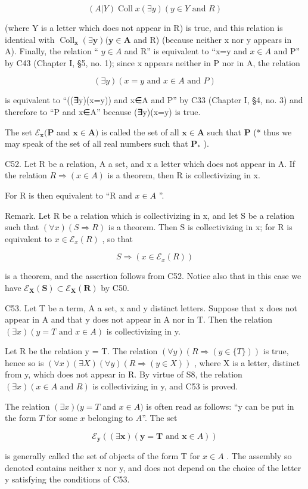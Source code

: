 \[
(A | Y) \operatorname{Coll} x (\exists y) (y \in Y \text {   and   } R)
\]

(where Y is a letter which does not appear in R) is true, and this relation is identical with \(\operatorname{Coll}_{\mathbf{x}}(\exists\mathbf{y})(\mathbf{y}\in\mathbf{A}\) and R) (because neither x nor y appears in A). Finally, the relation `` \(y\in A\) and R'' is equivalent to ``x=y and \(x\in A\) and P'' by C43 (Chapter I, §5, no. 1); since x appears neither in P nor in A, the relation

\[
(\exists y) (x = y \text {   and   } x \in A \text {   and   } P)
\]

is equivalent to ``((∃y)(x=y)) and x∈A and P'' by C33 (Chapter I, §4, no. 3) and therefore to ``P and x∈A'' because (∃y)(x=y) is true.

The set \(\mathcal{E}_{\pmb{x}}(\pmb{P}\) and \(\pmb{x} \in \pmb{A})\) is called the set of all \(\pmb{x} \in \pmb{A}\) such that \(\pmb{P}\) (* thus we may speak of the set of all real numbers such that \(\pmb{P}_{*}\) ).

C52. Let R be a relation, A a set, and x a letter which does not appear in A. If the relation \(R \Longrightarrow (x \in A)\) is a theorem, then R is collectivizing in x.

For R is then equivalent to ``R and \(x \in A\) ''.

Remark. Let R be a relation which is collectivizing in x, and let S be a relation such that \((\forall x)(S \Longrightarrow R)\) is a theorem. Then S is collectivizing in x; for R is equivalent to \(x \in \mathcal{E}_{x}(R)\) , so that

\[
S \Longrightarrow (x \in \mathcal {E} _ {x} (R))
\]

is a theorem, and the assertion follows from C52. Notice also that in this case we have \(\mathcal{E}_{\pmb{X}}(\pmb{S}) \subset \mathcal{E}_{\pmb{X}}(\pmb{R})\) by C50.

C53. Let T be a term, A a set, x and y distinct letters. Suppose that x does not appear in A and that y does not appear in A nor in T. Then the relation \((\exists x)(y = T \text{ and } x \in A)\) is collectivizing in y.

Let R be the relation y = T. The relation \((\forall y)(R \Longrightarrow (y \in \{T\}))\) is true, hence so is \((\forall x)(\exists X)(\forall y)(R \Longrightarrow (y \in X))\) , where X is a letter, distinct from y, which does not appear in R. By virtue of S8, the relation \((\exists x)(x \in A \text{ and } R)\) is collectivizing in y, and C53 is proved.

The relation \((\exists x)(y = T\) and \(x \in A)\) is often read as follows: ``y can be put in the form \(T\) for some \(x\) belonging to \(A\)''. The set

\[
\mathcal {E} _ {\boldsymbol {y}} ((\exists \boldsymbol {x}) (\boldsymbol {y} = \boldsymbol {T} \text {   and   } \boldsymbol {x} \in A))
\]

is generally called the set of objects of the form T for \(x \in A\) . The assembly so denoted contains neither x nor y, and does not depend on the choice of the letter y satisfying the conditions of C53.

